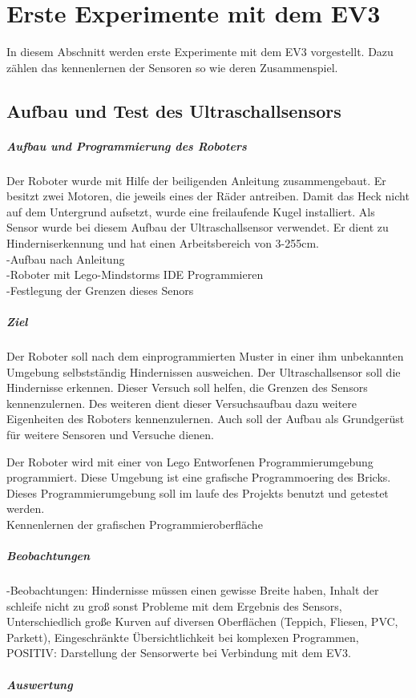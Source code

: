 \chapter{Erste Experimente mit dem EV3}
In diesem Abschnitt werden erste Experimente mit dem EV3 vorgestellt. Dazu zählen das kennenlernen der Sensoren so wie deren Zusammenspiel. 
\section{Aufbau und Test des Ultraschallsensors}
\paragraph{Aufbau und Programmierung des Roboters}
Der Roboter wurde mit Hilfe der beiligenden Anleitung zusammengebaut. Er besitzt zwei Motoren, die jeweils eines der Räder antreiben. Damit das Heck nicht auf dem Untergrund aufsetzt, wurde eine freilaufende Kugel installiert. 
Als Sensor wurde bei diesem Aufbau der Ultraschallsensor verwendet. Er dient zu Hinderniserkennung und hat einen Arbeitsbereich von 3-255cm. \\
 
-Aufbau nach Anleitung\\
-Roboter mit Lego-Mindstorms IDE Programmieren \\
-Festlegung der Grenzen dieses Senors\\
\paragraph{Ziel}
Der Roboter soll nach dem einprogrammierten Muster in einer ihm unbekannten Umgebung selbstständig Hindernissen ausweichen. Der Ultraschallsensor soll die Hindernisse erkennen. Dieser Versuch soll helfen, die Grenzen des Sensors kennenzulernen. Des weiteren dient dieser Versuchsaufbau dazu weitere Eigenheiten des Roboters kennenzulernen. Auch soll der Aufbau als Grundgerüst für weitere Sensoren und Versuche dienen.  

Der Roboter wird mit einer von Lego Entworfenen Programmierumgebung programmiert. Diese Umgebung ist eine grafische Programmoering des Bricks. Dieses Programmierumgebung soll im laufe des Projekts benutzt und getestet werden. \\


Kennenlernen der grafischen Programmieroberfläche\\ 
\paragraph{Beobachtungen}
-Beobachtungen: Hindernisse müssen einen gewisse Breite haben, Inhalt der schleife nicht zu groß sonst Probleme mit dem Ergebnis des Sensors, Unterschiedlich große Kurven auf diversen Oberflächen (Teppich, Fliesen, PVC, Parkett), Eingeschränkte Übersichtlichkeit bei komplexen Programmen,
POSITIV: Darstellung der Sensorwerte bei Verbindung mit dem EV3. \\
\paragraph{Auswertung}
